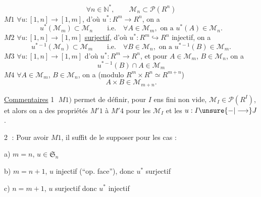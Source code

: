 \[
\forall n\in\mathbb N^*,\qquad\mathcal M_n\subset\mathcal P(R^n)
\]
\textcircled{\scriptsize$M1$} $\forall u:[1,n]\longrightarrow[1,m]$, d'où $u^*:R^m\longrightarrow R^n$, on a
\[
u^*(\mathcal M_m)\subset\mathcal M_n\qquad\text{i.e.}\quad\forall A\in\mathcal M_m,\text{ on a }u^*(A)\in\mathcal M_n.
\]
\textcircled{\scriptsize$M2$} $\forall u:[1,n]\longrightarrow[1,m]$ \uline{surjectif}, d'où $u^*:R^m\hookrightarrow R^n$ injectif, on a
\[
u^{*-1}(\mathcal M_n)\subset\mathcal M_m\qquad\text{i.e.}\quad\forall B\in\mathcal M_n,\text{ on a }u^{*-1}(B)\in\mathcal M_m.
\]
\textcircled{\scriptsize$M3$} $\forall u:[1,n]\longrightarrow[1,m]$ d'où $u^*:R^m\longrightarrow R^n$, et pour $A\in\mathcal M_m$, $B\in\mathcal M_n$, on a
\[
u^{*-1}(B)\cap A\in\mathcal M_m
\]
\textcircled{\scriptsize$M4$} $\forall A\in\mathcal M_m$, $B\in\mathcal M_n$, on a (modulo $R^m\times R^n\simeq R^{m+n}$)
\[
A\times B\in\mathcal M_{m+n}.
\]

\uline{Commentaires} \textcircled{1} $M1)$ permet de définir, pour  $I$ ens fini non vide, $\mathcal M_I\in\mathcal P(R^I)$, et alors on a des propriétés $M'1$ à $M'4$ pour les $\mathcal M_I$ et les $u:I\unsure{-|\longrightarrow}J$.

\textcircled{2} : Pour avoir $M1$, il suffit de le supposer pour les  cas :

a) $m=n$, $u\in\mathfrak S_n$

b) $m=n+1$, $u$ injectif (``op. face''), donc $u^*$ surjectif

c) $n=m+1$, $u$ surjectif   donc $u^*$ injectif




